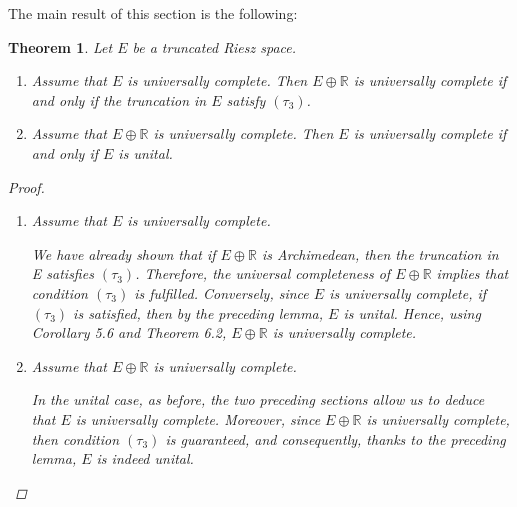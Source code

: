 \documentclass{birkau}
\numberwithin{equation}{section}
\theoremstyle{plain}
\newtheorem{theorem}{Theorem}[section]
\theoremstyle{definition}
\begin{document}
The main result of this section is the following:

\begin{theorem}
	Let $E$ be a truncated Riesz space. 
	
	\begin{enumerate}
		\item  Assume that $E$ is universally complete. Then $E\oplus 
		\mathbb{R}
		$ is universally complete if and only if the truncation in $E$ satisfy $%
		\left( \tau _{3}\right) $.
		
		\item Assume that $E\oplus 
		\mathbb{R}
		$ is universally complete. Then $E$ is universally complete if and only if $E
		$ is unital.
	\end{enumerate}
	
	\begin{proof}
		
		\begin{enumerate}
			\item Assume that $E$ is universally complete.
			
			We have already shown that if $E\oplus 
			\mathbb{R}
			$  is Archimedean,  then the truncation
			in E satisfies $\left( \tau _{3}\right) $. Therefore,  the universal
			completeness of $E\oplus 
			\mathbb{R}
			$ implies that condition $\left( \tau _{3}\right) $ is fulfilled.
			Conversely,  since $E$ is universally complete,  if $\left( \tau _{3}\right) $
			is satisfied,  then by the preceding lemma,  $E$ is unital.  Hence,  using
			Corollary 5.6 and Theorem 6.2,  $E\oplus 
			\mathbb{R}
			$ is universally complete.
			
			\item Assume that $E\oplus 
			\mathbb{R}
			$ is universally complete.
			
			In the unital case, as before, the two preceding sections allow us to deduce
			that $E$ is universally complete. Moreover, since $E\oplus 
			\mathbb{R}
			$ is universally complete, then condition $\left( \tau _{3}\right) $ is
			guaranteed, and consequently, thanks to the preceding lemma, $E$ is indeed
			unital.\qquad 
		\end{enumerate}
	\end{proof}
\end{theorem}
\end{document}
